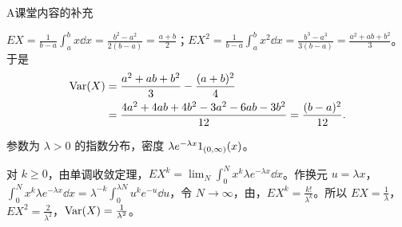 \begin{exercises}{A}{课堂内容的补充}
\begin{questions}
\begin{solution}
$EX=\frac1{b-a}\int_a^bx\dd x=\frac{b^2-a^2}{2(b-a)}=\frac{a+b}2$；$EX^2=\frac1{b-a}\int_a^bx^2\dd x=\frac{b^3-a^3}{3(b-a)}=\frac{a^2+ab+b^2}3$。于是
\[
\begin{aligned}
\operatorname{Var}(X)&=\frac{a^2+ab+b^2}3-\frac{(a+b)^2}4\\
&=\frac{4a^2+4ab+4b^2-3a^2-6ab-3b^2}{12}=\frac{(b-a)^2}{12}.
\end{aligned}
\]
\end{solution}
\item 参数为 $\lambda>0$ 的指数分布，密度 $\lambda e^{-\lambda x}1_{(0,\infty)}(x)$。
\begin{solution}
对 $k\geqslant0$，由单调收敛定理，$EX^k=\lim_N\int_0^Nx^k\lambda e^{-\lambda x}\dd x$。作换元 $u=\lambda x$，$\int_0^Nx^k\lambda e^{-\lambda x}\dd x=\lambda^{-k}\int_0^{\lambda N}u^ke^{-u}\dd u$，令 $N\to\infty$，由，$EX^k=\frac{k!}{\lambda^k}$。所以 $EX=\frac1\lambda$，$EX^2=\frac2{\lambda^2}$，$\operatorname{Var}(X)=\frac1{\lambda^2}$。
\end{solution}
\end{questions}
\end{exercises}

